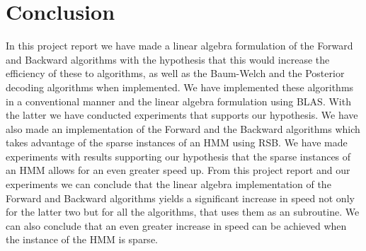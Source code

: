 \section{Conclusion}\label{sec:conclusion}


In this project report we have made a linear algebra formulation of the Forward and Backward algorithms with the hypothesis that this would increase the efficiency of these to algorithms, as well as the Baum-Welch and the Posterior decoding algorithms when implemented. We have implemented these algorithms in a conventional manner and the linear algebra formulation using BLAS. With the latter we have conducted experiments that supports our hypothesis. We have also made an implementation of the Forward and the Backward algorithms which takes advantage of the sparse instances of an HMM using RSB. We have made experiments with results supporting our hypothesis that the sparse instances of an HMM allows for an even greater speed up.
From this project report and our experiments we can conclude that the linear algebra implementation of the Forward and Backward algorithms yields a significant increase in speed not only for the latter two but for all the algorithms, that uses them as an subroutine. We can also conclude that an even greater increase in speed can be achieved when the instance of the HMM is sparse.




